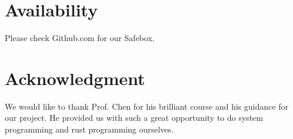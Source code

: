 \documentclass[conference,compsoc]{IEEEtran}
\begin{document}
\section{Availability}

	Please check Github.com for our Safebox.

\section*{Acknowledgment}
	We would like to thank Prof. Chen for his brilliant course and his guidance for our project. He provided us with such a great opportunity to do system programming and rust programming ourselves. 





\end{document}
